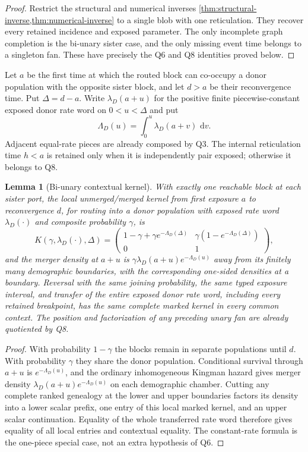 \documentclass[11pt]{article}
\newtheorem{lemma}[theorem]{Lemma}
\newcommand{\dd}{\,\mathrm d}
\begin{document}
\begin{proof}
Restrict the structural and numerical inverses
\cref{thm:structural-inverse,thm:numerical-inverse} to a single blob with one
reticulation.  They recover every retained incidence and exposed parameter.
The only incomplete graph completion is the bi-unary sister case, and the
only missing event time belongs to a singleton fan.  These have precisely
the Q6 and Q8 identities proved below.
\end{proof}

Let $a$ be the first time at which the routed block can co-occupy a donor
population with the opposite sister block, and let $d>a$ be their
reconvergence time.  Put $\Delta=d-a$.  Write $\lambda_D(a+u)$ for the positive finite
piecewise-constant exposed donor rate word on $0<u<\Delta$ and put
\[
 \Lambda_D(u)=\int_0^u\lambda_D(a+v)\,\dd v.
\]
Adjacent equal-rate pieces are already composed by Q3.  The internal
reticulation time $h<a$ is retained only when it is independently pair
exposed; otherwise it belongs to Q8.

\begin{lemma}[Bi-unary contextual kernel]
\label{lem:biunary}
With exactly one reachable block at each sister port, the local
unmerged/merged kernel from first exposure $a$ to reconvergence $d$, for
routing into a donor population with exposed rate word $\lambda_D(\cdot)$ and composite probability
$\gamma$, is
\[
 K(\gamma,\lambda_D(\cdot),\Delta)=
 \begin{pmatrix}
 1-\gamma+\gamma e^{-\Lambda_D(\Delta)}&\gamma(1-e^{-\Lambda_D(\Delta)})\\
 0&1
 \end{pmatrix},
\]
and the merger density at $a+u$ is
$\gamma\lambda_D(a+u)e^{-\Lambda_D(u)}$ away from its finitely many demographic
boundaries, with the corresponding one-sided densities at a boundary.  Reversal with the same joining probability,
the same typed exposure interval, and transfer of the entire exposed donor rate word, including every retained breakpoint, has
the same complete marked kernel in every common context.  The position and
factorization of any preceding unary fan are already quotiented by Q8.
\end{lemma}

\begin{proof}
With probability $1-\gamma$ the blocks remain in separate populations until $d$.  With probability $\gamma$ they share the donor population.  Conditional survival through $a+u$ is $e^{-\Lambda_D(u)}$, and the ordinary inhomogeneous Kingman hazard gives merger density $\lambda_D(a+u)e^{-\Lambda_D(u)}$ on each demographic chamber.  Cutting any complete ranked genealogy at the lower and upper boundaries factors its density into a lower scalar prefix, one entry of this local marked kernel, and an upper scalar continuation.  Equality of the whole transferred rate word therefore gives equality of all local entries and contextual equality.  The constant-rate formula is the one-piece special case, not an extra hypothesis of Q6.
\end{proof}
\end{document}
